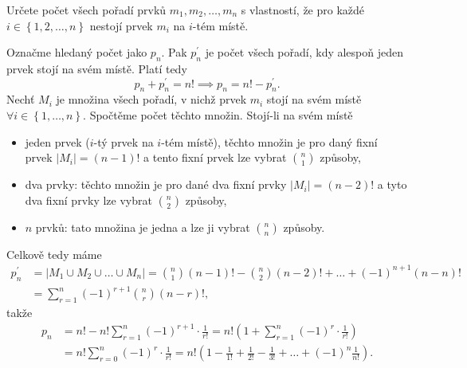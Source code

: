 \begin{priklad}
Určete počet všech pořadí prvků $m_1,m_2,\dots,m_n$ s vlastností, že
pro každé $i\in \left \{ 1,2,\dots,n \right \} $ nestojí prvek $m_i$ na $i$-tém
místě.
\end{priklad}

\begin{reseni}
Označme hledaný počet jako $p_n$. Pak $p_n^\prime$ je počet všech pořadí,
kdy alespoň jeden prvek stojí na svém místě. Platí tedy
$$p_n+p_n^\prime = n! \implies p_n=n!-p_n^\prime.$$
Nechť $M_i$ je množina všech pořadí, v nichž prvek $m_i$ stojí na svém místě
$\forall i\in \left \{ 1,\dots,n \right \} $. Spočtěme počet těchto množin. Stojí-li
na svém místě
\begin{itemize}
\item jeden prvek ($i$-tý prvek na $i$-tém místě), těchto množin
je pro daný fixní prvek $|M_i|=(n-1)!$ a tento fixní prvek lze
vybrat $\binom{n}{1}$ způsoby,
\item dva prvky: těchto množin je pro dané dva fixní prvky $|M_i|=(n-2)!$ a tyto
dva fixní prvky lze vybrat $\binom{n}{2}$ způsoby,
\item $n$ prvků: tato množina je jedna a lze ji vybrat $\binom{n}{n}$ způsoby.
\end{itemize}
Celkově tedy máme
\begin{align*}
p_n^\prime & = |M_1\cup M_2\cup \dots \cup M_n|=\binom{n}{1}(n-1)!-\binom{n}{2}(n-2)!+\dots+(-1)^{n+1}(n-n)!\\
 &= \sum_{r=1}^n (-1)^{r+1}\binom{n}{r}(n-r)!,
\end{align*}
takže
\begin{align*}
    p_n &= n!-n! \sum_{r=1}^n(-1)^{r+1}\cdot \frac{1}{r!}=n!\left ( 1+\sum_{r=1} ^n (-1)^r\cdot \frac{1}{r!}\right )\\
   &= n!\sum_{r=0}^n (-1)^r \cdot \frac{1}{r!}=n!\left ( 1-\frac{1}{1!}+\frac{1}{2!}-\frac{1}{3!}+\dots + (-1)^n \frac{1}{n!}\right ).
\end{align*}

\end{reseni}
